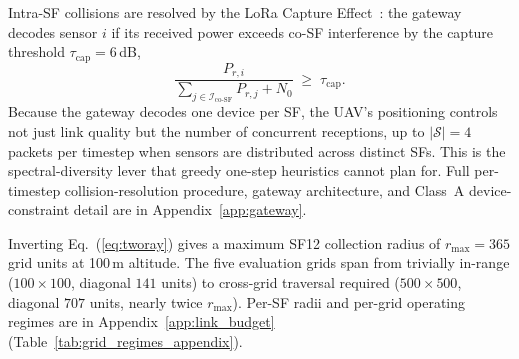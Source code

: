 Intra-SF collisions are resolved by the LoRa Capture
Effect~\cite{croce2020lora}: the gateway decodes sensor $i$ if its
received power exceeds co-SF interference by the capture threshold
$\tau_{\mathrm{cap}} = 6$\,dB,
\begin{equation}
    \frac{P_{r,i}}{\sum_{j\in\mathcal{I}_{\mathrm{co\text{-}SF}}} P_{r,j} + N_0}
    \;\geq\; \tau_{\mathrm{cap}}.
    \label{eq:capture}
\end{equation}
\label{sec:capture}
Because the gateway decodes one device per SF, the UAV's positioning
controls not just link quality but the number of concurrent
receptions, up to $|\mathcal{S}|=4$ packets per timestep when sensors
are distributed across distinct SFs. This is the spectral-diversity
lever that greedy one-step heuristics cannot plan for. Full
per-timestep collision-resolution procedure, gateway architecture,
and Class~A device-constraint detail are in
Appendix~\ref{app:gateway}.

\label{sec:link_budget}Inverting Eq.~(\ref{eq:tworay}) gives a maximum SF12 collection radius of $r_{\max} = 365$ grid units at 100\,m altitude. The five evaluation grids span from trivially in-range ($100{\times}100$, diagonal $141$ units) to cross-grid traversal required ($500{\times}500$, diagonal $707$ units, nearly twice $r_{\max}$). Per-SF radii and per-grid operating regimes are in Appendix~\ref{app:link_budget} (Table~\ref{tab:grid_regimes_appendix}).
